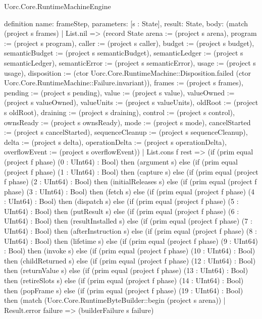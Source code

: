 \begin{lexlean}{Uorc.Core.RuntimeMachineEngine}
\begin{semanticmodule}
definition{
  name: frameStep,
  parameters: [s : State],
  result: State,
  body: (match (project s frames)
    | List.nil => (record State {arena := (project s arena), program := (project s program), caller := (project s caller), budget := (project s budget), semanticBudget := (project s semanticBudget), semanticLedger := (project s semanticLedger), semanticError := (project s semanticError), usage := (project s usage), disposition := (ctor Uorc.Core.RuntimeMachine::Disposition.failed (ctor Uorc.Core.RuntimeMachine::Failure.invariant)), frames := (project s frames), pending := (project s pending), value := (project s value), valueOwned := (project s valueOwned), valueUnits := (project s valueUnits), oldRoot := (project s oldRoot), draining := (project s draining), control := (project s control), ownsReady := (project s ownsReady), mode := (project s mode), cancelStarted := (project s cancelStarted), sequenceCleanup := (project s sequenceCleanup), delta := (project s delta), operationDelta := (project s operationDelta), overflowEvent := (project s overflowEvent)})
    | List.cons f rest => (if (prim equal (project f phase) (0 : UInt64) : Bool) then (argument s) else (if (prim equal (project f phase) (1 : UInt64) : Bool) then (capture s) else (if (prim equal (project f phase) (2 : UInt64) : Bool) then (initialReleases s) else (if (prim equal (project f phase) (3 : UInt64) : Bool) then (fetch s) else (if (prim equal (project f phase) (4 : UInt64) : Bool) then (dispatch s) else (if (prim equal (project f phase) (5 : UInt64) : Bool) then (putResult s) else (if (prim equal (project f phase) (6 : UInt64) : Bool) then (resultInstalled s) else (if (prim equal (project f phase) (7 : UInt64) : Bool) then (afterInstruction s) else (if (prim equal (project f phase) (8 : UInt64) : Bool) then (lifetime s) else (if (prim equal (project f phase) (9 : UInt64) : Bool) then (invoke s) else (if (prim equal (project f phase) (10 : UInt64) : Bool) then (childReturned s) else (if (prim equal (project f phase) (12 : UInt64) : Bool) then (returnValue s) else (if (prim equal (project f phase) (13 : UInt64) : Bool) then (retireSlots s) else (if (prim equal (project f phase) (14 : UInt64) : Bool) then (popFrame s) else (if (prim equal (project f phase) (19 : UInt64) : Bool) then (match (Uorc.Core.RuntimeByteBuilder::begin (project s arena))
      | Result.error failure => (builderFailure s failure)
}
\end{semanticmodule}
\end{lexlean}
